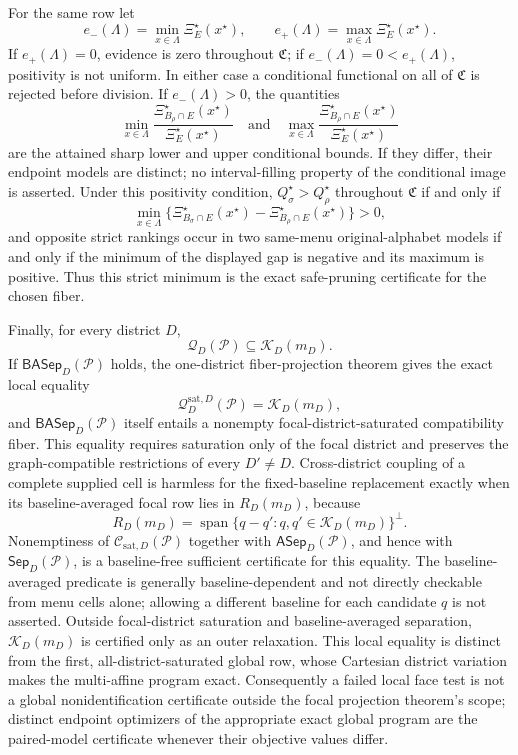 For the same row let
\[
e_-(\Lambda)=\min_{x\in\Lambda}\Xi_E^\star(x^\star),
\qquad e_+(\Lambda)=\max_{x\in\Lambda}\Xi_E^\star(x^\star).
\]
If \(e_+(\Lambda)=0\), evidence is zero throughout \(\mathfrak C\); if \(e_-(\Lambda)=0<e_+(\Lambda)\), positivity is not uniform. In either case a conditional functional on all of \(\mathfrak C\) is rejected before division. If \(e_-(\Lambda)>0\), the quantities
\[
\min_{x\in\Lambda}
\frac{\Xi_{B_\rho\cap E}^\star(x^\star)}{\Xi_E^\star(x^\star)}
\quad\text{and}\quad
\max_{x\in\Lambda}
\frac{\Xi_{B_\rho\cap E}^\star(x^\star)}{\Xi_E^\star(x^\star)}
\]
are the attained sharp lower and upper conditional bounds. If they differ, their endpoint models are distinct; no interval-filling property of the conditional image is asserted. Under this positivity condition, \(Q_\sigma^\star>Q_\rho^\star\) throughout \(\mathfrak C\) if and only if
\[
\min_{x\in\Lambda}
\{\Xi_{B_\sigma\cap E}^\star(x^\star)-\Xi_{B_\rho\cap E}^\star(x^\star)\}>0,
\]
and opposite strict rankings occur in two same-menu original-alphabet models if and only if the minimum of the displayed gap is negative and its maximum is positive. Thus this strict minimum is the exact safe-pruning certificate for the chosen fiber.

Finally, for every district \(D\),
\[
\mathcal Q_D(\mathcal P)\subseteq\mathcal K_D(m_D).
\]
If \(\mathsf{BASep}_D(\mathcal P)\) holds, the one-district fiber-projection theorem gives the exact local equality
\[
\mathcal Q_D^{\mathrm{sat},D}(\mathcal P)=\mathcal K_D(m_D),
\]
and \(\mathsf{BASep}_D(\mathcal P)\) itself entails a nonempty focal-district-saturated compatibility fiber. This equality requires saturation only of the focal district and preserves the graph-compatible restrictions of every \(D'\ne D\). Cross-district coupling of a complete supplied cell is harmless for the fixed-baseline replacement exactly when its baseline-averaged focal row lies in \(R_D(m_D)\), because
\[
R_D(m_D)=\operatorname{span}\{q-q':q,q'\in\mathcal K_D(m_D)\}^{\perp}.
\]
Nonemptiness of \(\mathcal C_{\mathrm{sat},D}(\mathcal P)\) together with \(\mathsf{ASep}_D(\mathcal P)\), and hence with \(\mathsf{Sep}_D(\mathcal P)\), is a baseline-free sufficient certificate for this equality. The baseline-averaged predicate is generally baseline-dependent and not directly checkable from menu cells alone; allowing a different baseline for each candidate \(q\) is not asserted. Outside focal-district saturation and baseline-averaged separation, \(\mathcal K_D(m_D)\) is certified only as an outer relaxation. This local equality is distinct from the first, all-district-saturated global row, whose Cartesian district variation makes the multi-affine program exact. Consequently a failed local face test is not a global nonidentification certificate outside the focal projection theorem's scope; distinct endpoint optimizers of the appropriate exact global program are the paired-model certificate whenever their objective values differ.